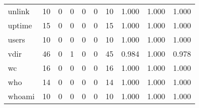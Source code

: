 \begin{longtable}{lp{2.0cm}p{2.0cm}p{2.0cm}p{2.0cm}p{2.0cm}p{2.0cm}p{2.0cm}p{2.0cm}p{2.0cm}}
unlink    &                     10 &                                             0 &                                            0 &                                           0 &                                            0 &                                         10 &                                1.000 &                                  1.000 &                                1.000 \\
uptime    &                     15 &                                             0 &                                            0 &                                           0 &                                            0 &                                         15 &                                1.000 &                                  1.000 &                                1.000 \\
users     &                     10 &                                             0 &                                            0 &                                           0 &                                            0 &                                         10 &                                1.000 &                                  1.000 &                                1.000 \\
vdir      &                     46 &                                             0 &                                            1 &                                           0 &                                            0 &                                         45 &                                0.984 &                                  1.000 &                                0.978 \\
wc        &                     16 &                                             0 &                                            0 &                                           0 &                                            0 &                                         16 &                                1.000 &                                  1.000 &                                1.000 \\
who       &                     14 &                                             0 &                                            0 &                                           0 &                                            0 &                                         14 &                                1.000 &                                  1.000 &                                1.000 \\
whoami    &                     10 &                                             0 &                                            0 &                                           0 &                                            0 &                                         10 &                                1.000 &                                  1.000 &                                1.000 \\

\end{longtable}
